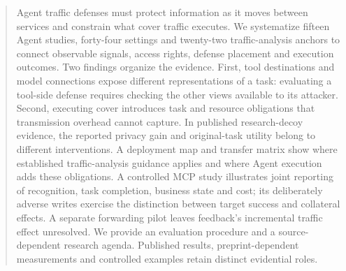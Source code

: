\begin{abstract}
Agent traffic defenses must protect information as it moves between services and constrain what cover traffic executes. We systematize fifteen Agent studies, forty-four settings and twenty-two traffic-analysis anchors to connect observable signals, access rights, defense placement and execution outcomes. Two findings organize the evidence. First, tool destinations and model connections expose different representations of a task: evaluating a tool-side defense requires checking the other views available to its attacker. Second, executing cover introduces task and resource obligations that transmission overhead cannot capture. In published research-decoy evidence, the reported privacy gain and original-task utility belong to different interventions. A deployment map and transfer matrix show where established traffic-analysis guidance applies and where Agent execution adds these obligations. A controlled MCP study illustrates joint reporting of recognition, task completion, business state and cost; its deliberately adverse writes exercise the distinction between target success and collateral effects. A separate forwarding pilot leaves feedback's incremental traffic effect unresolved. We provide an evaluation procedure and a source-dependent research agenda. Published results, preprint-dependent measurements and controlled examples retain distinct evidential roles.
\end{abstract}
